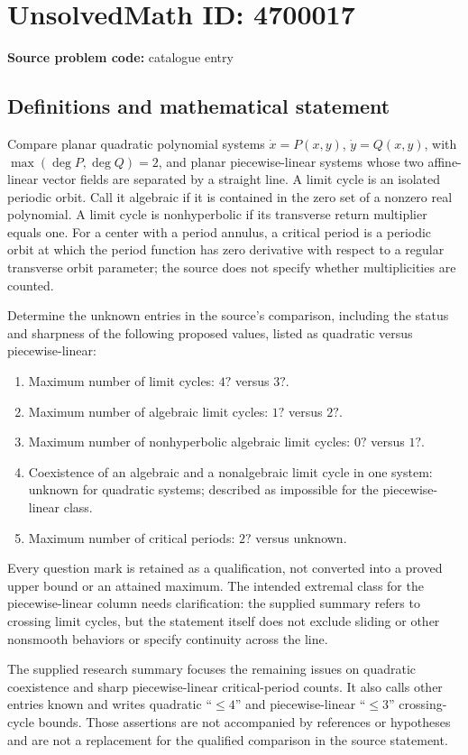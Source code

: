 \documentclass[11pt]{article}
\begin{document}
\section*{UnsolvedMath ID: 4700017}
\textbf{Source problem code:} catalogue entry
\subsection{Definitions and mathematical statement}
Compare planar quadratic polynomial systems $\dot x=P(x,y)$, $\dot y=Q(x,y)$, with $\max(\deg P,\deg Q)=2$, and planar piecewise-linear systems whose two affine-linear vector fields are separated by a straight line. A limit cycle is an isolated periodic orbit. Call it algebraic if it is contained in the zero set of a nonzero real polynomial. A limit cycle is nonhyperbolic if its transverse return multiplier equals one. For a center with a period annulus, a critical period is a periodic orbit at which the period function has zero derivative with respect to a regular transverse orbit parameter; the source does not specify whether multiplicities are counted.

Determine the unknown entries in the source's comparison, including the status and sharpness of the following proposed values, listed as quadratic versus piecewise-linear:
\begin{enumerate}
\item Maximum number of limit cycles: $4?$ versus $3?$.
\item Maximum number of algebraic limit cycles: $1?$ versus $2?$.
\item Maximum number of nonhyperbolic algebraic limit cycles: $0?$ versus $1?$.
\item Coexistence of an algebraic and a nonalgebraic limit cycle in one system: unknown for quadratic systems; described as impossible for the piecewise-linear class.
\item Maximum number of critical periods: $2?$ versus unknown.
\end{enumerate}
Every question mark is retained as a qualification, not converted into a proved upper bound or an attained maximum. The intended extremal class for the piecewise-linear column needs clarification: the supplied summary refers to crossing limit cycles, but the statement itself does not exclude sliding or other nonsmooth behaviors or specify continuity across the line.

The supplied research summary focuses the remaining issues on quadratic coexistence and sharp piecewise-linear critical-period counts. It also calls other entries known and writes quadratic ``$\leq4$'' and piecewise-linear ``$\leq3$'' crossing-cycle bounds. Those assertions are not accompanied by references or hypotheses and are not a replacement for the qualified comparison in the source statement.
\end{document}
